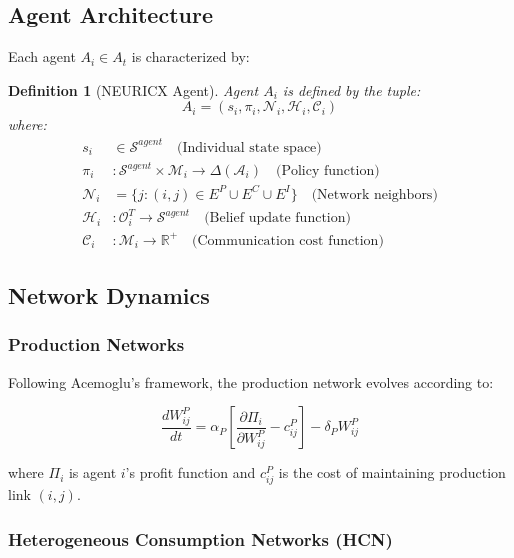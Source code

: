 \documentclass[12pt,a4paper]{article}
\newtheorem{definition}[theorem]{Definition}
\begin{document}
\subsection{Agent Architecture}

Each agent $A_i \in A_t$ is characterized by:

\begin{definition}[NEURICX Agent]
Agent $A_i$ is defined by the tuple:
\begin{equation}
A_i = (s_i, \pi_i, \mathcal{N}_i, \mathcal{H}_i, \mathcal{C}_i)
\end{equation}
where:
\begin{align}
s_i &\in \mathcal{S}^{agent} \quad \text{(Individual state space)} \\
\pi_i &: \mathcal{S}^{agent} \times \mathcal{M}_i \rightarrow \Delta(\mathcal{A}_i) \quad \text{(Policy function)} \\
\mathcal{N}_i &= \{j : (i,j) \in E^P \cup E^C \cup E^I\} \quad \text{(Network neighbors)} \\
\mathcal{H}_i &: \mathcal{O}_i^T \rightarrow \mathcal{S}^{agent} \quad \text{(Belief update function)} \\
\mathcal{C}_i &: \mathcal{M}_i \rightarrow \mathbb{R}^+ \quad \text{(Communication cost function)}
\end{align}
\end{definition}

\subsection{Network Dynamics}

\subsubsection{Production Networks}

Following Acemoglu's framework, the production network evolves according to:

\begin{equation}
\frac{dW_{ij}^P}{dt} = \alpha_P \left[\frac{\partial \Pi_i}{\partial W_{ij}^P} - c_{ij}^P\right] - \delta_P W_{ij}^P
\end{equation}

where $\Pi_i$ is agent $i$'s profit function and $c_{ij}^P$ is the cost of maintaining production link $(i,j)$.

\subsubsection{Heterogeneous Consumption Networks (HCN)}
\end{document}
